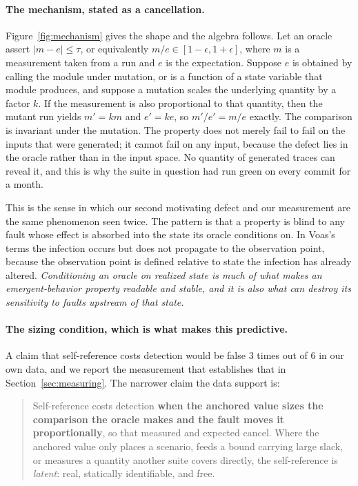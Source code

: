 \documentclass[12pt]{article}
\begin{document}
\paragraph{The mechanism, stated as a cancellation.} Figure~\ref{fig:mechanism}
gives the shape and the algebra follows. Let an oracle assert
$|m - e| \le \tau$, or equivalently $m/e \in [1-\epsilon, 1+\epsilon]$, where $m$
is a measurement taken from a run and $e$ is the expectation. Suppose $e$ is
obtained by calling the module under mutation, or is a function of a state
variable that module produces, and suppose a mutation scales the underlying
quantity by a factor $k$. If the measurement is also proportional to that
quantity, then the mutant run yields $m' = km$ and $e' = ke$, so
$m'/e' = m/e$ exactly. The comparison is invariant under the mutation. The
property does not merely fail to fail on the inputs that were generated; it
cannot fail on any input, because the defect lies in the oracle rather than in
the input space. No quantity of generated traces can reveal it, and this is why
the suite in question had run green on every commit for a month.

This is the sense in which our second motivating defect and our measurement are
the same phenomenon seen twice. The pattern is that a property is blind to any
fault whose effect is absorbed into the state its oracle conditions on. In Voas's
terms the infection occurs but does not propagate to the observation point,
because the observation point is defined relative to state the infection has
already altered. \emph{Conditioning an oracle on realized state is much of what
makes an emergent-behavior property readable and stable, and it is also what can
destroy its sensitivity to faults upstream of that state.}

\paragraph{The sizing condition, which is what makes this predictive.} A claim
that self-reference costs detection would be false 3 times out of 6 in our
own data, and we report the measurement that establishes that in
Section~\ref{sec:measuring}. The narrower claim the data support is:

\begin{quote}
Self-reference costs detection \textbf{when the anchored value sizes the
comparison the oracle makes and the fault moves it proportionally}, so that
measured and expected cancel. Where the anchored value only places a scenario,
feeds a bound carrying large slack, or measures a quantity another suite covers
directly, the self-reference is \emph{latent}: real, statically identifiable, and
free.
\end{quote}
\end{document}
